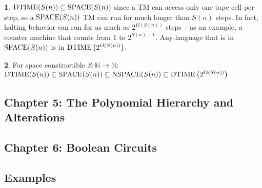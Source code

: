 \documentclass[10pt]{article}
\theoremstyle{definition}
\newtheorem{note}{}[section]
\begin{document}
\begin{note}
  $\mathrm{DTIME}(S(n)) \subseteq \mathrm{SPACE}(S(n))$ since a TM can access only one
  tape cell per step, so a $\mathrm{SPACE}(S(n))$ TM can run for much longer than
  $S(n)$ steps.
  In fact, halting behavior can run for as much as $2^{\Omega (S(n))}$ steps
  -- as an example, a counter machine that counts from $1$ to
  $2^{S(n) - 1}$.
  Any language that is in $\mathrm{SPACE}(S(n))$ is
  in $\mathrm{DTIME}\left(2^{O(S(n))}\right)$.
\end{note}

\begin{note}
  For space constructible $S: \mathbb{N} \to \mathbb{N}$:
  $\mathrm{DTIME}(S(n)) \subseteq \mathrm{SPACE}(S(n)) \subseteq \mathrm{NSPACE}(S(n))
  \subseteq \mathrm{DTIME}\left(2^{O(S(n))}\right)$
\end{note}



\subsection*{Chapter 5: The Polynomial Hierarchy and Alterations}



\subsection*{Chapter 6: Boolean Circuits}


\subsection*{Examples}
\end{document}
